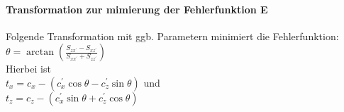 \paragraph{Transformation zur mimierung der Fehlerfunktion E}
Folgende Transformation mit ggb. Parametern minimiert die Fehlerfunktion:\\
$\theta=\arctan \left(\frac{S_{z x^{\prime}}-S_{x z^{\prime}}}{S_{x x^{\prime}}+S_{z z^{\prime}}}\right)$
\\
Hierbei ist \\
$t_{x}=c_{x}-\left(c_{x}^{\prime} \cos \theta-c_{z}^{\prime} \sin \theta\right)$ und \\
$t_{z}=c_{z}-\left(c_{x}^{\prime} \sin \theta+c_{z}^{\prime} \cos \theta\right)$

